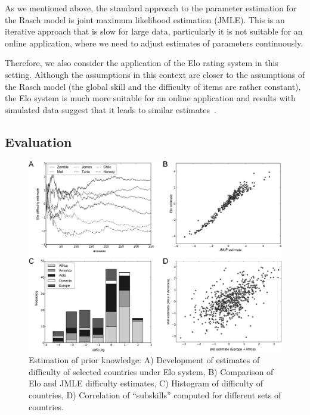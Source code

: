\documentclass{edm_template}
\begin{document}
As we mentioned above, the standard approach to the parameter estimation for the
Rasch model is joint maximum likelihood estimation (JMLE). This is an iterative
approach that is slow for large data, particularly it is not suitable for
an online application, where we need to adjust estimates of
parameters continuously.

Therefore, we also consider the application of the Elo rating system in this
setting. Although the assumptions in this context are closer to the assumptions
of the Rasch model (the global skill and the difficulty of items are rather
constant), the Elo system is much more suitable for an online application and
results with simulated data suggest that it leads to similar
estimates~\cite{decayelo}.



\subsection{Evaluation}

\begin{figure}[t]
  \centering

  \includegraphics[width=\linewidth]{edm-2014-geography-models/prior-knowledge-fig}

  \caption{Estimation of prior knowledge: A) Development of estimates of
    difficulty of selected countries under Elo system, B) Comparison of Elo
    and JMLE difficulty estimates, C) Histogram of difficulty of countries, D)
    Correlation of ``subskills'' computed for different sets of countries.}
  \label{fig:prior-knowledge-eval}
\end{figure}
\end{document}
